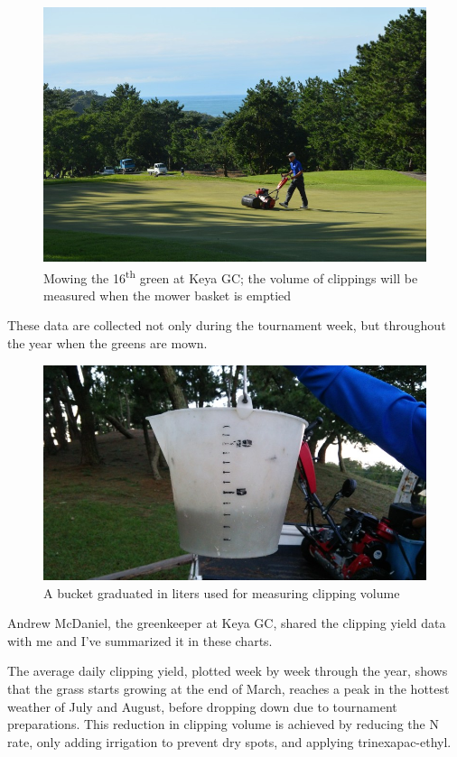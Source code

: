 \documentclass[12pt,b5,]{tufte-book}
\begin{document}
\begin{figure}
\centering
\includegraphics{img/b4-2.jpg}
\caption{Mowing the 16\textsuperscript{th} green at Keya GC; the volume of clippings will be measured when the mower basket is emptied}
\end{figure}

These data are collected not only during the tournament week, but throughout the year when the greens are mown.

\begin{figure}
\centering
\includegraphics{img/b4-3.jpg}
\caption{A bucket graduated in liters used for measuring clipping volume}
\end{figure}

Andrew McDaniel, the greenkeeper at Keya GC, shared the clipping yield data with me and I've summarized it in these charts.

The average daily clipping yield, plotted week by week through the year, shows that the grass starts growing at the end of March, reaches a peak in the hottest weather of July and August, before dropping down due to tournament preparations. This reduction in clipping volume is achieved by reducing the N rate, only adding irrigation to prevent dry spots, and applying trinexapac-ethyl.
\end{document}
